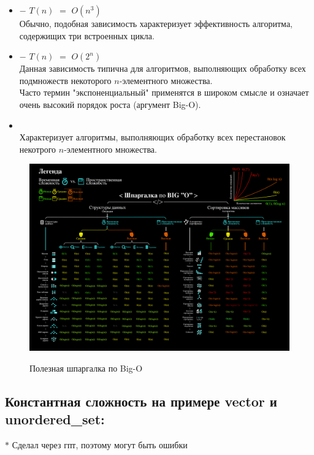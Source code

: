 \begin{itemize}
        \item {} $-$ $T(n)$ $=$ $O(n^3)$\\
            Обычно, подобная зависимость характеризует эффективность алгоритма, содержищих три встроенных цикла.
            
        \item {} $-$ $T(n)$ $=$ $O(2^n)$\\
            Данная зависимость типична для алгоритмов, выполняющих обработку всех подмножеств некоторого $n$-элементного множества.\\
            Часто термин "экспоненциальный" применятся в широком смысле и означает очень высокий порядок роста (аргумент Big-O).
        \item {}\\
            Характеризует алгоритмы, выполняющих обработку всех перестановок некотрого $n$-элементного множества.
            
    \end{itemize}

    \begin{figure}[H]
                    \centering
                    \includegraphics[width=1\textwidth]{images/chapter10/Shpargalka.png}
                    \label{fig:images/chapter10/Shpargalka.png}
                    \caption{Полезная шпаргалка по Big-O}
    \end{figure}
    
    \subsection{Константная сложность на примере vector и unordered\_set:}
    $\ast$ Сделал через гпт, поэтому могут быть ошибки\\
    
